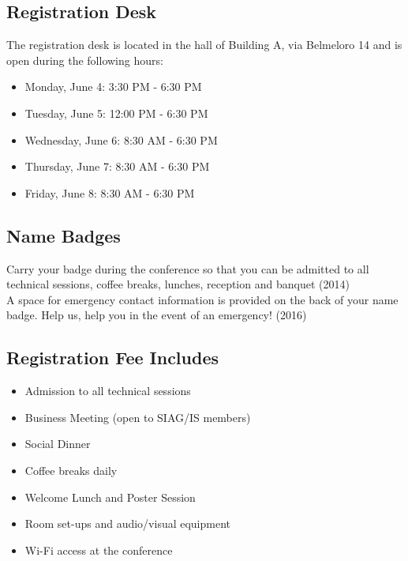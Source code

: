 \begin{multicols}{2}
\section*{Registration Desk}
The registration desk is located in the hall of Building A, via Belmeloro 14 and is open during the following hours:
\begin{itemize}
\item Monday, June 4: 3:30 PM - 6:30 PM
\item Tuesday, June 5: 12:00 PM - 6:30 PM
\item Wednesday, June 6: 8:30 AM - 6:30 PM
\item Thursday, June 7: 8:30 AM - 6:30 PM
\item Friday, June 8: 8:30 AM - 6:30 PM
\end{itemize}
\subsection*{Name Badges} Carry your badge during the conference so that you can be admitted to all technical sessions, coffee breaks, lunches, reception and banquet (2014)\\
A space for emergency contact information is provided on the back of your name badge. Help us, help you in the event of an emergency! (2016)
\subsection*{Registration Fee Includes}
\begin{itemize}
\item Admission to all technical sessions
\item Business Meeting (open to SIAG/IS members)
\item Social Dinner
\item Coffee breaks daily
\item Welcome Lunch and Poster Session
\item Room set-ups and audio/visual equipment
\item Wi-Fi access at the conference
\end{itemize}%

\end{multicols}
